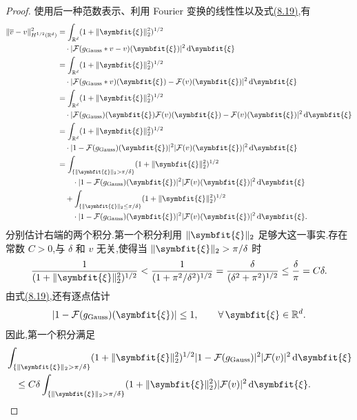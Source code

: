 \begin{proof}
使用后一种范数表示、利用 Fourier 变换的线性性以及式\hyperref[eq:gaussian-filter-fourier]{(8.19)},有
\[
\begin{aligned}
 \|\overline{v}-v\|_{H^{1/2}(\mathbb{R}^d)}^2
 &=\int_{\mathbb{R}^d}(1+\|\symbfit{\xi}\|_2^2)^{1/2}\\
  &\quad\cdot|\mathcal{F}(g_{\mathrm{Gauss}}*v-v)(\symbfit{\xi})|^2
    \,\mathrm{d}\symbfit{\xi}\\
 &=\int_{\mathbb{R}^d}(1+\|\symbfit{\xi}\|_2^2)^{1/2}\\
  &\quad\cdot|\mathcal{F}(g_{\mathrm{Gauss}}*v)(\symbfit{\xi})
       -\mathcal{F}(v)(\symbfit{\xi})|^2\,\mathrm{d}\symbfit{\xi}\\
 &=\int_{\mathbb{R}^d}(1+\|\symbfit{\xi}\|_2^2)^{1/2}\\
  &\quad\cdot|\mathcal{F}(g_{\mathrm{Gauss}})(\symbfit{\xi})
       \mathcal{F}(v)(\symbfit{\xi})-\mathcal{F}(v)(\symbfit{\xi})|^2
       \,\mathrm{d}\symbfit{\xi}\\
 &=\int_{\mathbb{R}^d}(1+\|\symbfit{\xi}\|_2^2)^{1/2}\\
  &\quad\cdot|1-\mathcal{F}(g_{\mathrm{Gauss}})(\symbfit{\xi})|^2
       |\mathcal{F}(v)(\symbfit{\xi})|^2\,\mathrm{d}\symbfit{\xi}\\
  &=\int_{\{\|\symbfit{\xi}\|_2>\pi/\delta\}}
      (1+\|\symbfit{\xi}\|_2^2)^{1/2}\\
  &\qquad\cdot|1-\mathcal{F}(g_{\mathrm{Gauss}})(\symbfit{\xi})|^2
      |\mathcal{F}(v)(\symbfit{\xi})|^2\,\mathrm{d}\symbfit{\xi}\\
  &\quad+\int_{\{\|\symbfit{\xi}\|_2\le\pi/\delta\}}
      (1+\|\symbfit{\xi}\|_2^2)^{1/2}\\
  &\qquad\cdot|1-\mathcal{F}(g_{\mathrm{Gauss}})(\symbfit{\xi})|^2
      |\mathcal{F}(v)(\symbfit{\xi})|^2\,\mathrm{d}\symbfit{\xi}.
\end{aligned}
\]
分别估计右端的两个积分.第一个积分利用 $\|\symbfit{\xi}\|_2$ 足够大这一事实.存在常数 $C>0$,与 $\delta$ 和 $v$ 无关,使得当 $\|\symbfit{\xi}\|_2>\pi/\delta$ 时
\[
 \frac{1}{(1+\|\symbfit{\xi}\|_2^2)^{1/2}}
  <\frac{1}{(1+\pi^2/\delta^2)^{1/2}}
  =\frac{\delta}{(\delta^2+\pi^2)^{1/2}}
  \le\frac{\delta}{\pi}=C\delta.
\]
由式\hyperref[eq:gaussian-filter-fourier]{(8.19)},还有逐点估计
\[
 |1-\mathcal{F}(g_{\mathrm{Gauss}})(\symbfit{\xi})|
  \le1,\qquad \forall\,\symbfit{\xi}\in\mathbb{R}^d.
\]
因此,第一个积分满足
\begin{equation}\label{eq:gaussian-filter-Hhalf-high-freq}
\begin{aligned}
 &\int_{\{\|\symbfit{\xi}\|_2>\pi/\delta\}}
    (1+\|\symbfit{\xi}\|_2^2)^{1/2}
    |1-\mathcal{F}(g_{\mathrm{Gauss}})|^2|\mathcal{F}(v)|^2
    \,\mathrm{d}\symbfit{\xi}\\
 &\quad\le C\delta
   \int_{\{\|\symbfit{\xi}\|_2>\pi/\delta\}}
     (1+\|\symbfit{\xi}\|_2^2)|\mathcal{F}(v)|^2
     \,\mathrm{d}\symbfit{\xi}.
\end{aligned}
\end{equation}


\end{proof}
